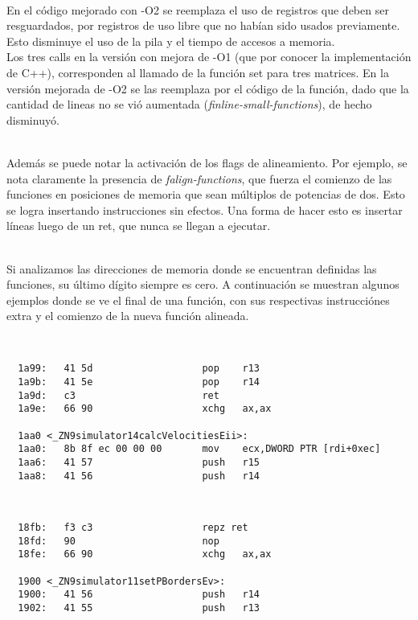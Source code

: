 ~\\

En el código mejorado con -O2 se reemplaza el uso de registros que deben ser resguardados, por registros de uso libre que no habían sido usados previamente. Esto disminuye el uso de la pila y el tiempo de accesos a memoria.\\
Los tres calls en la versión con mejora de -O1 (que por conocer la implementación de C++), corresponden al llamado de la función set para tres matrices. En la versión mejorada de -O2 se las reemplaza por el código de la función, dado que la cantidad de lineas no se vió aumentada (\textit{finline-small-functions}), de hecho disminuyó.

~\\

Además se puede notar la activación de los flags de alineamiento. Por ejemplo, se nota claramente la presencia de \textit{falign-functions}, que fuerza el comienzo de las funciones en posiciones de memoria que sean múltiplos de potencias de dos. Esto se logra insertando instrucciones sin efectos. Una forma de hacer esto es insertar líneas luego de un ret, que nunca se llegan a ejecutar. 


~\\

Si analizamos las direcciones de memoria donde se encuentran definidas las funciones, su último dígito siempre es cero. A continuación se muestran algunos ejemplos donde se ve el final de una función, con sus respectivas instrucciónes extra y el comienzo de la nueva función alineada.

~\\

{}
\begin{lstlisting}
  1a99:   41 5d                   pop    r13
  1a9b:   41 5e                   pop    r14
  1a9d:   c3                      ret    
  1a9e:   66 90                   xchg   ax,ax

  1aa0 <_ZN9simulator14calcVelocitiesEii>:
  1aa0:   8b 8f ec 00 00 00       mov    ecx,DWORD PTR [rdi+0xec]
  1aa6:   41 57                   push   r15
  1aa8:   41 56                   push   r14
\end{lstlisting}
~\\

{}
\begin{lstlisting}
  18fb:   f3 c3                   repz ret 
  18fd:   90                      nop
  18fe:   66 90                   xchg   ax,ax

  1900 <_ZN9simulator11setPBordersEv>:
  1900:   41 56                   push   r14
  1902:   41 55                   push   r13
\end{lstlisting}


